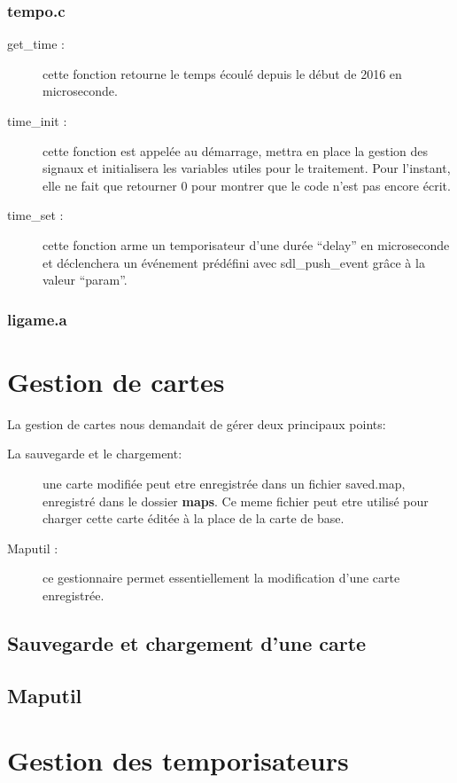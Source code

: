 \documentclass{report}
\begin{document}
\subsection{tempo.c}
\begin{description}
\item[get\_time :] cette fonction retourne le temps écoulé depuis le début de 2016 en microseconde.
\item[time\_init :] cette fonction est appelée au démarrage, mettra en place la gestion des signaux et initialisera les variables utiles pour le traitement. Pour l'instant, elle ne fait que retourner 0 pour montrer que le code n'est pas encore écrit.
\item[time\_set :] cette fonction arme un temporisateur d'une durée ``delay'' en microseconde et déclenchera un événement prédéfini avec sdl\_push\_event grâce à la valeur ``param''.
\end{description}

\subsection{ligame.a}



\chapter{Gestion de cartes}
\setcounter{section}{0}
La gestion de cartes nous demandait de gérer deux principaux points:
\begin{description}
\item[La sauvegarde et le chargement:] une carte modifiée peut etre enregistrée dans un fichier saved.map, enregistré dans le dossier \textbf{maps}. Ce meme fichier peut etre utilisé pour charger cette carte éditée à la place de la carte de base.
\item[Maputil :] ce gestionnaire permet essentiellement la modification d'une carte enregistrée.
\end{description}

\section{Sauvegarde et chargement d'une carte}

\section{Maputil}

\chapter{Gestion des temporisateurs}
\setcounter{section}{0}
\end{document}
